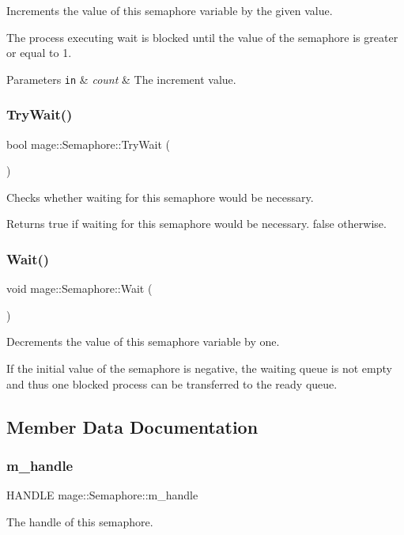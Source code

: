 Increments the value of this semaphore variable by the given value.

The process executing wait is blocked until the value of the semaphore is greater or equal to 1.


\begin{DoxyParams}[1]{Parameters}
\mbox{\tt in}  & {\em count} & The increment value. \\
\hline
\end{DoxyParams}
\hypertarget{classmage_1_1_semaphore_ab34cdf4e9b7388dbdb30aab167c074f6}{}\label{classmage_1_1_semaphore_ab34cdf4e9b7388dbdb30aab167c074f6} 
\subsubsection{\texorpdfstring{Try\+Wait()}{TryWait()}}
{\footnotesize\ttfamily bool mage\+::\+Semaphore\+::\+Try\+Wait (\begin{DoxyParamCaption}{ }\end{DoxyParamCaption})}

Checks whether waiting for this semaphore would be necessary.

\begin{DoxyReturn}{Returns}
{\ttfamily true} if waiting for this semaphore would be necessary. {\ttfamily false} otherwise. 
\end{DoxyReturn}
\hypertarget{classmage_1_1_semaphore_ae63599939b6bcc3939cbeddd7ffa5f66}{}\label{classmage_1_1_semaphore_ae63599939b6bcc3939cbeddd7ffa5f66} 
\subsubsection{\texorpdfstring{Wait()}{Wait()}}
{\footnotesize\ttfamily void mage\+::\+Semaphore\+::\+Wait (\begin{DoxyParamCaption}{ }\end{DoxyParamCaption})}

Decrements the value of this semaphore variable by one.

If the initial value of the semaphore is negative, the waiting queue is not empty and thus one blocked process can be transferred to the ready queue. 

\subsection{Member Data Documentation}
\hypertarget{classmage_1_1_semaphore_ac1ded856984b4ac3739d9ff627838fda}{}\label{classmage_1_1_semaphore_ac1ded856984b4ac3739d9ff627838fda} 
\subsubsection{\texorpdfstring{m\+\_\+handle}{m\_handle}}
{\footnotesize\ttfamily H\+A\+N\+D\+LE mage\+::\+Semaphore\+::m\+\_\+handle\hspace{0.3cm}{\ttfamily [private]}}

The handle of this semaphore. 